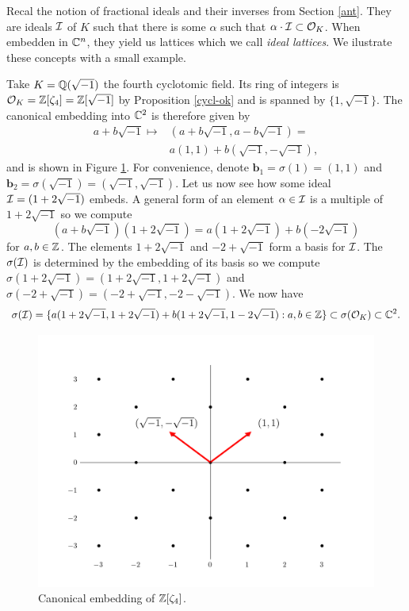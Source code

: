 Recal the notion of fractional ideals and their inverses from Section \ref{ant}. They are ideals $\mathcal{I}$ of $K$ such that there is some $\alpha$ such that $\alpha \cdot \mathcal{I} \subset \mathcal{O}_K$. When embedden in $\mathbb{C}^n$, they yield us lattices which we call \textit{ideal lattices}. We ilustrate these concepts with a small example.
\begin{example}
	Take $K = \mathbb{Q}(\sqrt{-1})$ the fourth cyclotomic field. Its ring of integers is $\mathcal{O}_K = \mathbb{Z}[\zeta_4] = \mathbb{Z}[\sqrt{-1}]$ by Proposition \ref{cycl-ok} and is spanned by $\{1, \sqrt{-1}\}$. The canonical embedding into $\mathbb{C}^2$ is therefore given by
	\begin{align*}
    a + b\sqrt{-1} \mapsto & (a + b\sqrt{-1}, a - b\sqrt{-1}) = \\
						   & a (1,1) +  b(\sqrt{-1}, -\sqrt{-1}),
 	\end{align*}
	and is shown in Figure \ref{fig:embed}. For convenience, denote $\bm{b}_1 = \sigma(1) = (1,1)$ and $\bm{b}_2 = \sigma(\sqrt{-1}) = (\sqrt{-1}, \sqrt{-1})$. Let us now see how some ideal $\mathcal{I} = (1 + 2\sqrt{-1})$ embeds. A general form of an element $\alpha \in \mathcal{I}$ is a multiple of $1 + 2\sqrt{-1}$ so we compute 
	\[(a +b\sqrt{-1})(1+2\sqrt{-1}) = a(1+2\sqrt{-1}) + b(-2 \sqrt{-1})\] for $a,b \in \mathbb{Z}$. The elements $1+2\sqrt{-1}$ and $-2 + \sqrt{-1}$ form a basis for $\mathcal{I}$. The $\sigma(\mathcal{I})$ is determined by the embedding of its basis so we compute $\sigma(1+2\sqrt{-1}) = (1+2\sqrt{-1}, 1+2\sqrt{-1})$ and $\sigma(-2 + \sqrt{-1}) = (-2 +\sqrt{-1}, -2 -\sqrt{-1})$. We now have
	\[ \sigma(\mathcal{I}) = \{a(1+2\sqrt{-1}, 1+2\sqrt{-1}) + b (1+2\sqrt{-1}, 1-2\sqrt{-1}) : a,b \in \mathbb{Z} \} \subset \sigma(\mathcal{O}_K) \subset \mathbb{C}^2. \]
\end{example}
	\begin{figure}[ht]
    \centering
    \includegraphics[scale=0.8]{images/ex_lattice.png}
    \caption{Canonical embedding of $\mathbb{Z}[\zeta_4]$.}
    \label{fig:embed}
\end{figure}

